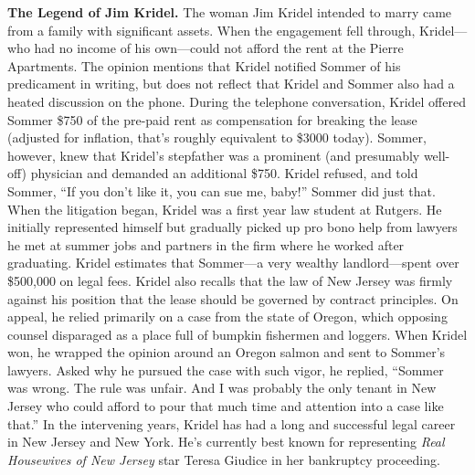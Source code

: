 \item \textbf{The Legend of Jim Kridel.}  The woman Jim Kridel intended to marry
came from a family with significant assets. When the engagement fell through,
Kridel---who had no income of his own---could not afford the rent at the Pierre
Apartments. The opinion mentions that Kridel notified Sommer of his predicament
in writing, but does not reflect that Kridel and Sommer also had a heated
discussion on the phone.  During the telephone conversation, Kridel offered
Sommer \$750 of the pre-paid rent as compensation for breaking the lease
(adjusted for inflation, that's roughly equivalent to \$3000 today).  Sommer,
however, knew that Kridel's stepfather was a prominent (and presumably
well-off) physician and demanded an additional \$750.  Kridel refused, and told
Sommer, ``If you don't like it, you can sue me, baby!'' Sommer did just that. 
When the litigation began, Kridel was a first year law student at Rutgers.  He
initially represented himself but gradually picked up pro bono help from
lawyers he met at summer jobs and partners in the firm where he worked after
graduating.  Kridel estimates that Sommer---a very wealthy landlord---spent
over \$500,000 on legal fees.  Kridel also recalls that the law of New Jersey
was firmly against his position that the lease should be governed by contract
principles.  On appeal, he relied primarily on a case from the state of Oregon,
which opposing counsel disparaged as a place full of bumpkin fishermen and
loggers.  When Kridel won, he wrapped the opinion around an Oregon salmon and
sent to Sommer's lawyers.  Asked why he pursued the case with such vigor, he
replied, ``Sommer was wrong.  The rule was unfair. And I was probably the only
tenant in New Jersey who could afford to pour that much time and attention into
a case like that.''  In the intervening years, Kridel has had a long and
successful legal career in New Jersey and New York.  He's currently best known
for representing \textit{Real Housewives of New Jersey} star Teresa Giudice in
her bankruptcy proceeding.  

